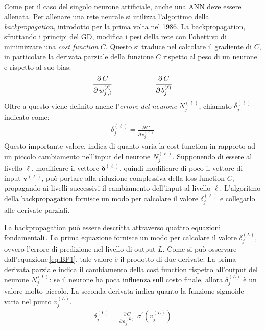 Come per il caso del singolo neurone artificiale, anche una \acs{ANN} deve essere allenata. Per allenare una rete neurale si utilizza l'algoritmo della \textit{backpropagation}, introdotto per la prima volta nel 1986. La backpropagation, sfruttando i principi del \acs{GD}, modifica i pesi della rete con l'obettivo di minimizzare una \textsl{cost function} $C$. Questo si traduce nel calcolare il gradiente di $C$, in particolare la derivata parziale della funzione $C$ rispetto al peso di un neurone e rispetto al suo bias:
% 
\begin{gather*}
    \frac{\partial\,C}{\partial\,w^{(\ell)}_{j\,,i}}
    \hspace{60px}
    \frac{\partial\,C}{\partial\,b^{(\ell)}_j}
\end{gather*}
% 
\noindent Oltre a questo viene definito anche l'\textsl{errore del neurone} $N^{(\ell)}_j$, chiamato $\delta^{(\ell)}_j$ indicato come:
% 
\begin{gather*}
    \delta^{(\ell)}_j = \frac{\partial\,C}{\partial\,v^{(\ell)}_j}
\end{gather*}
% 
\noindent Questo importante valore, indica di quanto varia la cost function in rapporto ad un piccolo cambiamento nell'input del neurone $N^{(\ell)}_j$. Supponendo di essere al livello $\ell$, modificare il vettore $\boldsymbol{\delta}^{(\ell)}$, quindi modificare di poco il vettore di input $\mathbf{v}^{(\ell)}$, può portare alla riduzione complessiva della loss function $C$, propagando ai livelli successivi il cambiamento dell'input al livello $\ell$. L'algoritmo della backpropagation fornisce un modo per calcolare il valore $\delta^{(\ell)}_j$ e collegarlo alle derivate parziali.

La backpropagation può essere descritta attraverso quattro equazioni fondamentali\,\cite{nielsen2015neural}. La prima equazione fornisce un modo per calcolare il valore $\delta^{(L)}_j$, ovvero l'errore di predizione nel livello di output $L$. Come si può osservare dall'equazione\,\ref{eq:BP1}, tale valore è il prodotto di due derivate. La prima derivata parziale indica il cambiamento della cost function rispetto all'output del neurone $N^{(L)}_j$: se il neurone ha poca influenza sull costo finale, allora $\delta^{(L)}_j$ è un valore molto piccolo. La seconda derivata indica quanto la funzione sigmoide varia nel punto $v^{(L)}_j$.
% 
\begin{gather}
    \delta^{(L)}_j = \frac{\partial\,C}{\partial\,a^{(L)}_j} \,\, \sigma^\prime \left( v^{(L)}_j \right)
    \label{eq:BP1}
\end{gather}

